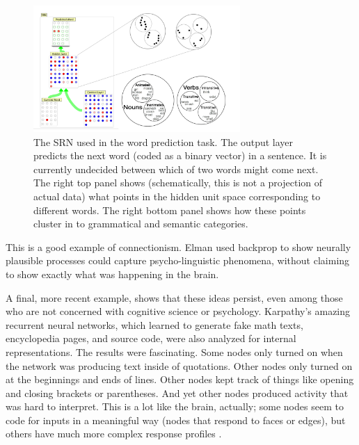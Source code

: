 \begin{figure}[h]
\centering
\includegraphics[width=0.7\textwidth]{images/elmanCategories.png}
\caption[Pamela Payne.]{The SRN used in the word prediction task. The output layer predicts the next word (coded as a binary vector) in a sentence. It is currently undecided between which of two words might come next. The right top panel shows (schematically, this is not a projection of actual data) what points in the hidden unit space corresponding to different words. The right bottom panel shows how these points cluster in to grammatical and semantic categories.}
\label{srn_words}
\end{figure}

This is a good example of connectionism. Elman used backprop to show neurally plausible processes could capture psycho-linguistic phenomena, without claiming to show exactly what was happening in the brain.

A final, more recent example, shows that these ideas persist, even among those who are not concerned with cognitive science or psychology. Karpathy's amazing recurrent neural networks, which learned to generate fake math texts, encyclopedia pages, and source code, were also analyzed for internal representations. The results were fascinating. Some nodes only turned on when the network was producing text inside of quotations. Other nodes only turned on at the beginnings and ends of lines. Other nodes kept track of things like opening and closing brackets or parentheses. And yet other nodes produced activity that was hard to interpret. This is a lot like the brain, actually; some nodes seem to code for inputs in a meaningful way (\eg nodes that respond to faces or edges), but others have much more complex response profiles \cite{karpathy2015visualizing}. 